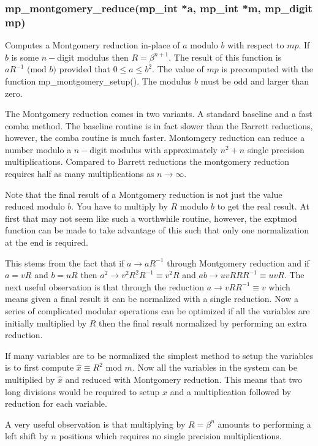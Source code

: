\documentclass{article}
\begin{document}
\subsubsection{mp\_montgomery\_reduce(mp\_int *a, mp\_int *m, mp\_digit mp)}
Computes a Montgomery reduction in-place of $a$ modulo $b$ with respect to $mp$.  If $b$ is some $n-$digit modulus then
$R = \beta^{n+1}$.  The result of this function is $aR^{-1} \mbox{ (mod }b\mbox{)}$ provided that $0 \le a \le b^2$.
The value of $mp$ is precomputed with the function mp\_montgomery\_setup().  The modulus $b$ must be odd and larger
than zero.  

The Montgomery reduction comes in two variants.  A standard baseline and a fast comba method.  The baseline routine
is in fact slower than the Barrett reductions, however, the comba routine is much faster.  Montomgery reduction can 
reduce a number modulo a $n-$digit modulus with approximately $n^2 + n$ single precision multiplications.  Compared
to Barrett reductions the montgomery reduction requires half as many multiplications as $n \rightarrow \infty$.  

Note that the final result of a Montgomery reduction is not just the value reduced modulo $b$.  You have to multiply
by $R$ modulo $b$ to get the real result.  At first that may not seem like such a worthwhile routine, however, the
exptmod function can be made to take advantage of this such that only one normalization at the end is required.

This stems from the fact that if $a \rightarrow aR^{-1}$ through Montgomery reduction and if $a = vR$ and $b = uR$ then
$a^2 \rightarrow v^2R^2R^{-1} \equiv v^2R$ and $ab \rightarrow uvRRR^{-1} \equiv uvR$.  The next useful observation is 
that through the reduction $a \rightarrow vRR^{-1} \equiv v$ which means given a final result it can be normalized with
a single reduction.  Now a series of complicated modular operations can be optimized if all the variables are initially
multiplied by $R$ then the final result normalized by performing an extra reduction.

If many variables are to be normalized the simplest method to setup the variables is to first compute $\hat x \equiv R^2 \mbox{ mod }m$.
Now all the variables in the system can be multiplied by $\hat x$ and reduced with Montgomery reduction.  This means that
two long divisions would be required to setup $\hat x$ and a multiplication followed by reduction for each variable.  

A very useful observation is that multiplying by $R = \beta^n$ amounts to performing a left shift by $n$ positions which
requires no single precision multiplications.  
\end{document}
